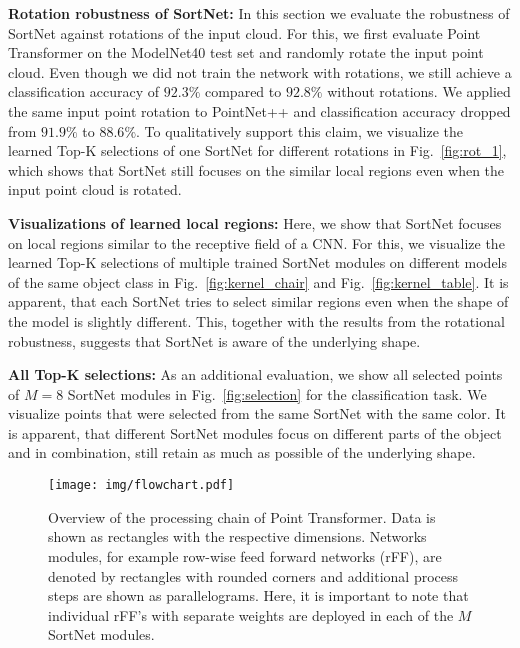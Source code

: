 \documentclass{ieeeaccess}
\begin{document}
\textbf{Rotation robustness of SortNet:}
In this section we evaluate the robustness of SortNet against rotations of the input cloud. For this, we first evaluate Point Transformer on the ModelNet40 test set and randomly rotate the input point cloud. Even though we did not train the network with rotations, we still achieve a classification accuracy of $92.3\%$ compared to $92.8\%$ without rotations. We applied the same input point rotation to PointNet++ and classification accuracy dropped from $91.9\%$ to $88.6\%$. To qualitatively support this claim, we visualize the learned Top-K selections of one SortNet for different rotations in Fig.~\ref{fig:rot_1}, which shows that SortNet still focuses on the similar local regions even when the input point cloud is rotated.

\textbf{Visualizations of learned local regions:} Here, we show that SortNet focuses on local regions similar to the receptive field of a CNN. For this, we visualize the learned Top-K selections of multiple trained SortNet modules on different models of the same object class in Fig.~\ref{fig:kernel_chair} and Fig.~\ref{fig:kernel_table}. It is apparent, that each SortNet tries to select similar regions even when the shape of the model is slightly different. This, together with the results from the rotational robustness, suggests that SortNet is aware of the underlying shape.

\textbf{All Top-K selections:} 
As an additional evaluation, we show all selected points of $M=8$ SortNet modules in Fig.~\ref{fig:selection} for the classification task. We visualize points that were selected from the same SortNet with the same color. It is apparent, that different SortNet modules focus on different parts of the object and in combination, still retain as much as possible of the underlying shape. 


\begin{figure*}
\begin{center}
\texttt{[image: img/flowchart.pdf]}
\end{center}
\caption{Overview of the processing chain of Point Transformer. Data is shown as rectangles with the respective dimensions. Networks modules, for example row-wise feed forward networks (rFF), are denoted by rectangles with rounded corners and additional process steps are shown as parallelograms. Here, it is important to note that individual rFF's  with separate weights are deployed in each of the $M$ SortNet modules.}
    \label{fig:point-transformer_flowchart}
\end{figure*}
\end{document}
